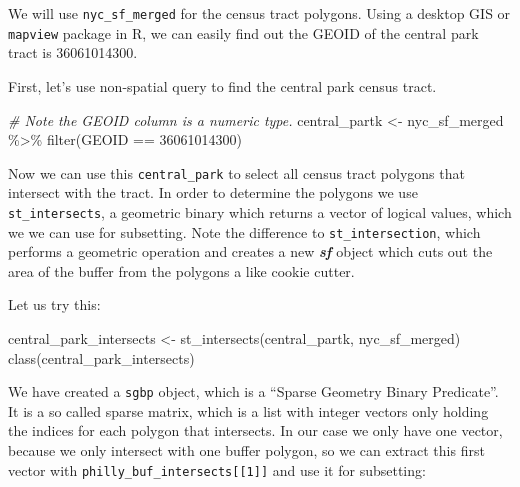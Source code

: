 \documentclass[
  11pt,
]{book}
\newenvironment{Shaded}{\begin{snugshade}}{\end{snugshade}}
\newcommand{\CommentTok}[1]{\textcolor[rgb]{0.56,0.35,0.01}{\textit{#1}}}
\newcommand{\DecValTok}[1]{\textcolor[rgb]{0.00,0.00,0.81}{#1}}
\newcommand{\FunctionTok}[1]{\textcolor[rgb]{0.00,0.00,0.00}{#1}}
\newcommand{\NormalTok}[1]{#1}
\newcommand{\OtherTok}[1]{\textcolor[rgb]{0.56,0.35,0.01}{#1}}
\newcommand{\SpecialCharTok}[1]{\textcolor[rgb]{0.00,0.00,0.00}{#1}}
\begin{document}
We will use \texttt{nyc\_sf\_merged} for the census tract polygons. Using a desktop GIS or \texttt{mapview} package in R, we can easily find out the GEOID of the central park tract is 36061014300.

First, let's use non-spatial query to find the central park census tract.

\begin{Shaded}
\begin{Highlighting}[]
\CommentTok{\# Note the GEOID column is a numeric type.}
\NormalTok{central\_partk }\OtherTok{\textless{}{-}}\NormalTok{ nyc\_sf\_merged }\SpecialCharTok{\%\textgreater{}\%} \FunctionTok{filter}\NormalTok{(GEOID }\SpecialCharTok{==} \DecValTok{36061014300}\NormalTok{)}
\end{Highlighting}
\end{Shaded}

Now we can use this \texttt{central\_park} to select all census tract polygons that intersect with the tract. In order to determine the polygons we use \texttt{st\_intersects}, a geometric binary which returns a vector of logical values, which we we can use for subsetting. Note the difference to \texttt{st\_intersection}, which performs a geometric operation and creates a new \textbf{\emph{sf}} object which cuts out the area of the buffer from the polygons a like cookie cutter.

Let us try this:

\begin{Shaded}
\begin{Highlighting}[]
\NormalTok{central\_park\_intersects }\OtherTok{\textless{}{-}} \FunctionTok{st\_intersects}\NormalTok{(central\_partk, nyc\_sf\_merged)}
\FunctionTok{class}\NormalTok{(central\_park\_intersects)}
\end{Highlighting}
\end{Shaded}

We have created a \texttt{sgbp} object, which is a ``Sparse Geometry Binary Predicate''. It is a so called sparse matrix, which is a list with integer vectors only holding the indices for each polygon that intersects. In our case we only have one vector, because we only intersect with one buffer polygon, so we can extract this first vector with \texttt{philly\_buf\_intersects{[}{[}1{]}{]}} and use it for subsetting:
\end{document}
